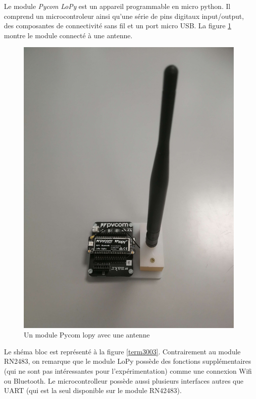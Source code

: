 Le module \textit{Pycom LoPy} \footnotemark[11] est un appareil programmable en micro python. Il comprend un microcontroleur ainsi qu'une série de pins digitaux input/output,  des composantes de connectivité sans fil et un port micro USB. La figure \ref{term35} montre le module  connecté à une antenne.

\newpage

\begin{figure}[h]
\centering

\includegraphics[scale=0.08]{images/lopy.png}
\caption{Un module Pycom lopy avec une antenne}\label{term35}
\end{figure}


Le shéma bloc \footnotemark[11]  est représenté à la figure \ref{term3003}. Contrairement au module RN2483, on remarque que le module LoPy possède des fonctions supplémentaires 
(qui ne sont pas intéressantes pour l'expérimentation) comme une connexion Wifi ou Bluetooth. Le microcontrolleur possède aussi plusieurs interfaces autres que UART (qui est la seul disponible sur le module RN42483).

